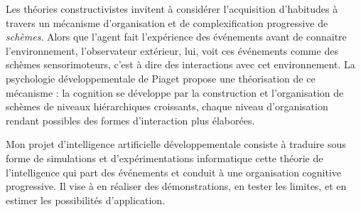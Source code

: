 Les théories constructivistes invitent à considérer l'acquisition d'habitudes à travers un mécanisme d'organisation et de complexification progressive de \emph{schèmes}. 
Alors que l'agent fait l'expérience des événements avant de connaitre l'environnement, l'observateur extérieur, lui, voit ces événements comme des schèmes sensorimoteurs, c'est à dire des interactions avec cet environnement.
La psychologie développementale de Piaget propose une théorisation de ce mécanisme : la cognition se développe par la construction et l'organisation de schèmes de niveaux hiérarchiques croissants, chaque niveau d'organisation rendant possibles des formes d'interaction plus élaborées.


Mon projet d'intelligence artificielle développementale consiste à traduire sous forme de simulations et d'expérimentations informatique cette théorie de l'intelligence qui part des événements et conduit à une organisation cognitive progressive. 
Il vise à en réaliser des démonstrations, en tester les limites, et en estimer les possibilités d'application.













